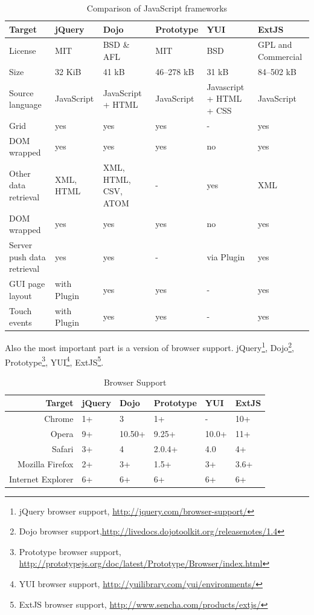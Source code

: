 	\begin{table}[H]
	\centering
	\begin{tabular}{|L{3cm}|l|L{2cm}|l|L{2cm}|L{2cm}|}
	\hline
	Target 			& jQuery & Dojo & Prototype & YUI & ExtJS \\
	\hline
	\hline
	License		& MIT & BSD \& AFL & MIT & BSD & GPL and Commercial \\
	\hline
	Size		& 32 KiB & 41 kB & 46–278 kB & 31 kB & 84–502 kB \\
	\hline
	Source language		& JavaScript & JavaScript + HTML & JavaScript &  Javascript + HTML + CSS & JavaScript \\
	\hline
	Grid		& yes & yes & yes & - & yes  \\
	\hline
	DOM wrapped		& yes & yes & yes & no & yes \\
	\hline
	Other data retrieval		& XML, HTML & XML, HTML, CSV, ATOM & - & yes & XML  \\
	\hline
	DOM wrapped		& yes & yes & yes & no & yes \\
	\hline
	Server push data retrieval		& yes & yes & - & via Plugin & yes \\
	\hline
	GUI page layout		& with Plugin & yes & yes & - & yes \\
	\hline 		
	Touch events		& with Plugin & yes & yes & - & yes \\
	\hline 
	\end{tabular}
	\caption[Caption in TOC]{Comparison of JavaScript frameworks}
	\label{tab:JS_frameworks}
	\end{table}
	Also the most important part is a version of browser support. jQuery\footnote{jQuery browser support, \url{http://jquery.com/browser-support/}}, Dojo\footnote{Dojo browser support,\url{http://livedocs.dojotoolkit.org/releasenotes/1.4}}, Prototype\footnote{Prototype browser support, \url{http://prototypejs.org/doc/latest/Prototype/Browser/index.html}}, YUI\footnote{YUI browser support, \url{http://yuilibrary.com/yui/environments/}}, ExtJS\footnote{ExtJS browser support, \url{http://www.sencha.com/products/extjs/}}.

	\begin{table}[H]
	\centering
	\begin{tabular}{|r|l|l|l|l|l|}
	\hline
	Target 			& jQuery & Dojo & Prototype & YUI & ExtJS \\
	\hline
	\hline
	Chrome		& 1+ & 3 & 1+ & - & 10+ \\
	\hline
	Opera		& 9+ & 10.50+ & 9.25+ & 10.0+ & 11+ \\
	\hline
	Safari		& 3+ & 4 & 2.0.4+ & 4.0 & 4+ \\
	\hline
	Mozilla Firefox		& 2+ & 3+ & 1.5+ & 3+ & 3.6+ \\
	\hline
	Internet Explorer		& 6+ & 6+ & 6+ & 6+ & 6+ \\
	\hline
	\end{tabular}
	\caption[Caption in TOC]{Browser Support}
	\label{tab:internal_results}
	\end{table}
    
